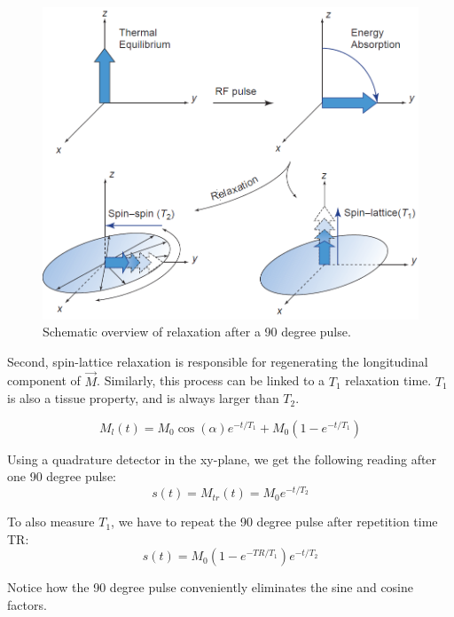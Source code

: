 \begin{figure}[ht]
\begin{center}
  \includegraphics[width=\linewidth]{img/relaxation.png}
  \caption{Schematic overview of relaxation after a 90 degree pulse. \cite{suetens}}
  \label{fig:relaxation}
\end{center}
\end{figure}

Second, spin-lattice relaxation is responsible for regenerating the
longitudinal component of $\vec{M}$. Similarly, this process can be linked to a
$T_1$ relaxation time. $T_1$ is also a tissue property, and is always larger
than $T_2$.

\begin{equation}
M_l(t) = M_0 \cos(\alpha) e^{-t/T_1} + M_0 (1 - e^{-t/T_1})
\end{equation}

Using a quadrature detector in the xy-plane, we get the following reading
after one 90 degree pulse:
\begin{equation}
s(t) = M_{tr}(t) = M_0 e^{-t/T_2}
\end{equation}

To also measure $T_1$, we have to repeat the 90 degree pulse after repetition
time TR:
\begin{equation}
s(t) = M_0 (1 - e^{-TR/T_1}) e^{-t/T_2}
\end{equation}

Notice how the 90 degree pulse conveniently eliminates the sine and cosine
factors.

